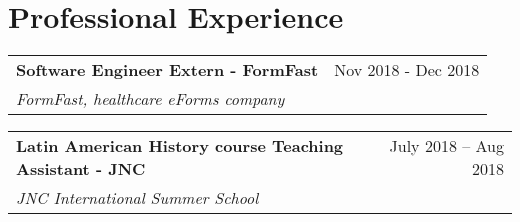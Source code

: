 
\section{Professional Experience}

\begin{tabularx}{\linewidth}{@{}l r@{}}
\textbf{Software Engineer Extern - FormFast}     &   \hfill Nov 2018 - Dec 2018 \\[3.75pt]
\textit{FormFast, healthcare eForms company} \\
\end{tabularx}


\begin{tabularx}{\linewidth}{@{}l r@{}}
\textbf{Latin American History course Teaching Assistant - JNC}     &   \hfill July 2018 – Aug 2018 \\[3.75pt]
\textit{JNC International Summer School} \\
\end{tabularx}
